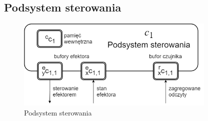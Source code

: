 \documentclass{article}
\begin{document}

\subsection{Podsystem sterowania}

\begin{figure}[H]
	\centering
	\includegraphics[width=0.85\textwidth]{podsystem_sterowania.png}
	\caption{Podsystem sterowania}
	\label{fig::podsystem_sterowania}
\end{figure}
\end{document}
